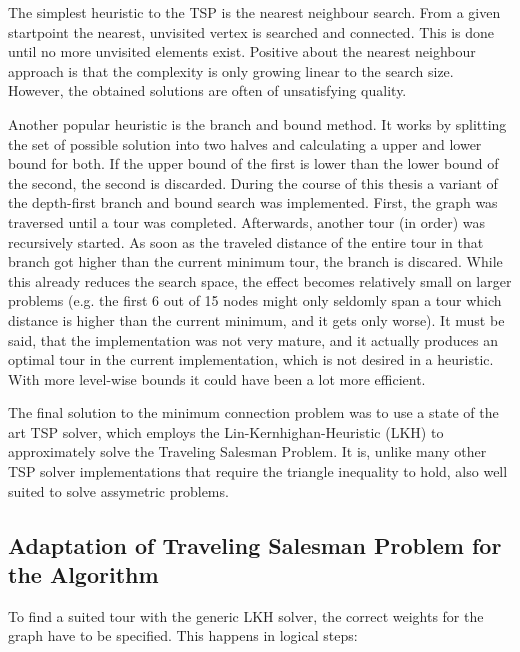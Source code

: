 \documentclass[10pt,twoside,a4paper]{report}
\begin{document}
The simplest heuristic to the TSP is the nearest neighbour search. From a given startpoint the nearest, unvisited vertex is searched and connected. This is done until no more unvisited elements exist. Positive about the nearest neighbour approach is that the complexity is only growing linear to the search size. However, the obtained solutions are often of unsatisfying quality.

Another popular heuristic is the branch and bound method. It works by splitting the set of possible solution into two halves and calculating a upper and lower bound for both. If the upper bound of the first is lower than the lower bound of the second, the second is discarded. During the course of this thesis a variant of the depth-first branch and bound search was implemented. First, the graph was traversed until a tour was completed. Afterwards, another tour (in order) was recursively started. As soon as the traveled distance of the entire tour in that branch got higher than the current minimum tour, the branch is discared. While this already reduces the search space, the effect becomes relatively small on larger problems (e.g. the first 6 out of 15 nodes might only seldomly span a tour which distance is higher than the current minimum, and it gets only worse).  It must be said, that the implementation was not very mature, and it actually produces an optimal tour in the current implementation, which is not desired in a heuristic. With more level-wise bounds it could have been a lot more efficient. 

The final solution to the minimum connection problem was to use a state of the art TSP solver\cite{helsgaun2000effective}, which employs the Lin-Kernhighan-Heuristic\cite{kernighan1970efficient} (LKH) to approximately solve the Traveling Salesman Problem. It is, unlike many other TSP solver implementations that require the triangle inequality to hold, also well suited to solve assymetric problems.
\subsection{Adaptation of Traveling Salesman Problem for the Algorithm}

To find a suited tour with the generic LKH solver, the correct weights for the graph have to be specified. This happens in logical steps:
\end{document}
